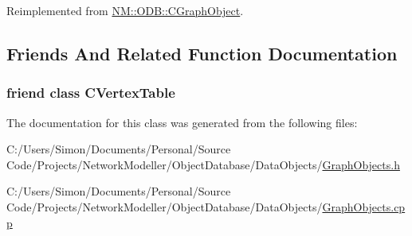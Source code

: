 Reimplemented from \hyperlink{class_n_m_1_1_o_d_b_1_1_c_graph_object_a8069a2286005ece610484b60ee8c0fde}{N\+M\+::\+O\+D\+B\+::\+C\+Graph\+Object}.



\subsection{Friends And Related Function Documentation}
\hypertarget{class_n_m_1_1_o_d_b_1_1_c_vertex_a1d86cbedc9bc2eb368c4ef78ee139e3d}{}
\subsubsection[{C\+Vertex\+Table}]{\setlength{\rightskip}{0pt plus 5cm}friend class {\bf C\+Vertex\+Table}\hspace{0.3cm}{\ttfamily [friend]}}\label{class_n_m_1_1_o_d_b_1_1_c_vertex_a1d86cbedc9bc2eb368c4ef78ee139e3d}


The documentation for this class was generated from the following files\+:\begin{DoxyCompactItemize}
\item 
C\+:/\+Users/\+Simon/\+Documents/\+Personal/\+Source Code/\+Projects/\+Network\+Modeller/\+Object\+Database/\+Data\+Objects/\hyperlink{_graph_objects_8h}{Graph\+Objects.\+h}\item 
C\+:/\+Users/\+Simon/\+Documents/\+Personal/\+Source Code/\+Projects/\+Network\+Modeller/\+Object\+Database/\+Data\+Objects/\hyperlink{_graph_objects_8cpp}{Graph\+Objects.\+cpp}\end{DoxyCompactItemize}
